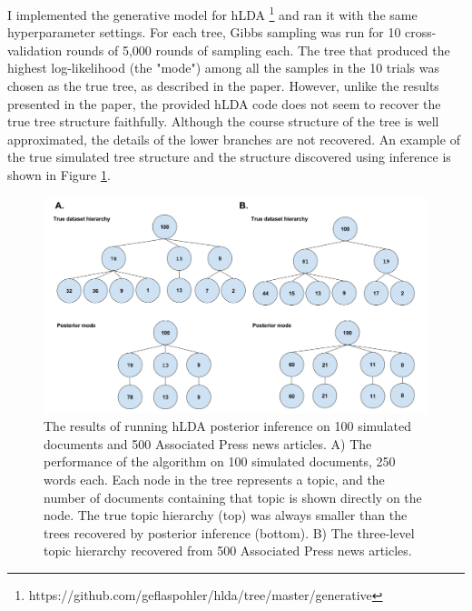 \documentclass{article}
\begin{document}
I implemented the generative model for hLDA \footnote{https://github.com/geflaspohler/hlda/tree/master/generative} and ran it with the same hyperparameter settings. For each tree, Gibbs sampling was run for 10 cross-validation rounds of 5,000 rounds of sampling each. The tree that produced the highest log-likelihood (the "mode") among all the samples in the 10 trials was chosen as the true tree, as described in the paper. However, unlike the results presented in the paper, the provided hLDA code does not seem to recover the true tree structure faithfully. Although the course structure of the tree is well approximated, the details of the lower branches are not recovered. An example of the true simulated tree structure and the structure discovered using inference is shown in Figure \ref{fig:sim}. 

\begin{figure}[h]
\centering
\includegraphics[scale=0.28]{sim_final}
\caption{The results of running hLDA posterior inference on 100 simulated documents and 500 Associated Press news articles. A) The performance of the algorithm on 100 simulated documents, 250 words each. Each node in the tree represents a topic, and the number of documents containing that topic is shown directly on the node. The true topic hierarchy (top) was always smaller than the trees recovered by posterior inference (bottom). B) The three-level topic hierarchy recovered from 500 Associated Press news articles.}
\label{fig:sim}
\end{figure}
\end{document}
